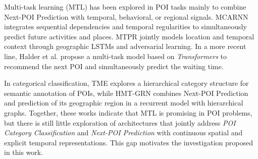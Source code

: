 Multi-task learning (MTL) \cite{caruana1997multitask} has been explored in POI tasks mainly to combine Next-POI Prediction with temporal, behavioral, or regional signals. MCARNN \cite{Liao2018} integrates sequential dependencies and temporal regularities to simultaneously predict future activities and places. MTPR \cite{Xia2020} jointly models location and temporal context through geographic LSTMs and adversarial learning. In a more recent line, Halder et al. \cite{Halder2022} propose a multi-task model based on \textit{Transformers} to recommend the next POI and simultaneously predict the waiting time.

In categorical classification, TME \cite{Xu2023} explores a hierarchical category structure for semantic annotation of POIs, while HMT-GRN \cite{Lim2022} combines Next-POI Prediction and prediction of its geographic region in a recurrent model with hierarchical graphs. Together, these works indicate that MTL is promising in POI problems, but there is still little exploration of architectures that jointly address \textit{POI Category Classification} and \textit{Next-POI Prediction} with continuous spatial and explicit temporal representations. This gap motivates the investigation proposed in this work.

